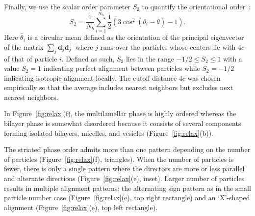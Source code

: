 \documentclass[prb,preprint,showpacs,preprintnumbers,amsmath,amssymb,longbibliography]{revtex4-2}
\newcommand{\dd}{\mathbf{d}}
\begin{document}
Finally, we use the scalar order parameter $S_2$ to quantify the
orientational order~\cite{Selinger2016}:
\begin{equation}
  \label{eq:S2}
S_2 = \frac{1}{N_b} \sum_{i=1}^{N_b} \frac{1}{2}(3\cos^2(\theta_i - \bar \theta) - 1).
\end{equation}
Here $\bar \theta_i$ is a circular mean defined as the orientation of
the principal eigenvector of the matrix $\sum_{j} \dd_j\dd_j^\top$ where
$j$ runs over the particles whose centers lie with $4c$ of that of
particle $i$. Defined as such, $S_2$ lies in the range $-1/2 \le S_2 \le
1$ with a value $S_2 = 1$ indicating perfect alignment between particles
while $S_2=-1/2$ indicating isotropic alignment locally. The cutoff
distance $4c$ was chosen empirically so that the average includes
nearest neighbors but excludes next nearest neighbors.

In Figure~\ref{fig:relax}(f), the multilamellar phase is highly ordered
whereas the bilayer phase is somewhat disordered because it consists of
several components forming isolated bilayers, micelles, and vesicles
(Figure~\ref{fig:relax}(b)).

The striated phase order admits more than one pattern depending on the
number of particles (Figure~\ref{fig:relax}(f), triangles). When the
number of particles is fewer, there is only a single pattern where the
directors are more or less parallel and alternate directions
(Figure~\ref{fig:relax}(e), inset). Larger number of particles results
in multiple alignment patterns: the alternating sign pattern as in the
small particle number case (Figure~\ref{fig:relax}(e), top right
rectangle) and an `X'-shaped alignment (Figure~\ref{fig:relax}(e), top
left rectangle).

\end{document}
